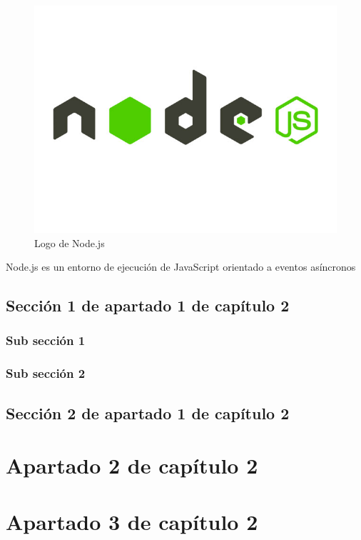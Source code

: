 \begin{figure}[h]
    \centering
    \includegraphics[scale=0.2]{include/figuras/node.jpg}
    \caption{Logo de Node.js}
    \label{fig:node}
\end{figure}

Node.js es un entorno de ejecución de JavaScript \cite{javascript} orientado a eventos asíncronos


\subsection{}

\subsection{Sección 1 de apartado 1 de capítulo 2}

\subsubsection{Sub sección 1}

\subsubsection{Sub sección 2}

\subsection{Sección 2 de apartado 1 de capítulo 2}

\section{Apartado 2 de capítulo 2}

\section{Apartado 3 de capítulo 2}
